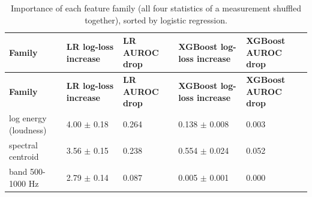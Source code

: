 \documentclass[11pt,a4paper]{article}
\begin{document}
\begin{center}\small\renewcommand{\arraystretch}{1.15}
\begin{longtable}{>{\raggedright\arraybackslash}p{4.00cm}>{\raggedleft\arraybackslash}p{2.60cm}>{\raggedleft\arraybackslash}p{2.60cm}>{\raggedleft\arraybackslash}p{2.60cm}>{\raggedleft\arraybackslash}p{2.60cm}}
\caption{Importance of each feature family (all four statistics of a measurement shuffled together), sorted by logistic regression.}\\
\toprule
\textbf{\hspace{0pt}Family} & \textbf{\hspace{0pt}LR log-loss increase} & \textbf{\hspace{0pt}LR AUROC drop} & \textbf{\hspace{0pt}XGBoost log-loss increase} & \textbf{\hspace{0pt}XGBoost AUROC drop}\\\midrule\endfirsthead
\toprule
\textbf{\hspace{0pt}Family} & \textbf{\hspace{0pt}LR log-loss increase} & \textbf{\hspace{0pt}LR AUROC drop} & \textbf{\hspace{0pt}XGBoost log-loss increase} & \textbf{\hspace{0pt}XGBoost AUROC drop}\\\midrule\endhead
\bottomrule\endfoot
\hspace{0pt}log energy (loudness) & \hspace{0pt}4.00 $\pm$ 0.18 & \hspace{0pt}0.264 & \hspace{0pt}0.138 $\pm$ 0.008 & \hspace{0pt}0.003\\
\hspace{0pt}spectral centroid & \hspace{0pt}3.56 $\pm$ 0.15 & \hspace{0pt}0.238 & \hspace{0pt}0.554 $\pm$ 0.024 & \hspace{0pt}0.052\\
\hspace{0pt}band 500-1000 Hz & \hspace{0pt}2.79 $\pm$ 0.14 & \hspace{0pt}0.087 & \hspace{0pt}0.005 $\pm$ 0.001 & \hspace{0pt}0.000\\

\end{longtable}
\end{center}
\end{document}

